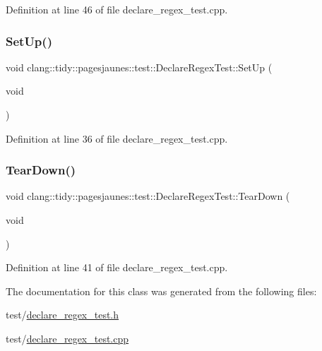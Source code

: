 Definition at line 46 of file declare\+\_\+regex\+\_\+test.\+cpp.

\mbox{\label{classclang_1_1tidy_1_1pagesjaunes_1_1test_1_1_declare_regex_test_ae35e7b27f89dc217207465fe9b408b4f}} 
\subsubsection{\texorpdfstring{Set\+Up()}{SetUp()}}
{\footnotesize\ttfamily void clang\+::tidy\+::pagesjaunes\+::test\+::\+Declare\+Regex\+Test\+::\+Set\+Up (\begin{DoxyParamCaption}\item[{void}]{ }\end{DoxyParamCaption})\hspace{0.3cm}{\ttfamily [virtual]}}



Definition at line 36 of file declare\+\_\+regex\+\_\+test.\+cpp.

\mbox{\label{classclang_1_1tidy_1_1pagesjaunes_1_1test_1_1_declare_regex_test_ae2ff4360622063301d3044b15f2ea85a}} 
\subsubsection{\texorpdfstring{Tear\+Down()}{TearDown()}}
{\footnotesize\ttfamily void clang\+::tidy\+::pagesjaunes\+::test\+::\+Declare\+Regex\+Test\+::\+Tear\+Down (\begin{DoxyParamCaption}\item[{void}]{ }\end{DoxyParamCaption})\hspace{0.3cm}{\ttfamily [virtual]}}



Definition at line 41 of file declare\+\_\+regex\+\_\+test.\+cpp.



The documentation for this class was generated from the following files\+:\begin{DoxyCompactItemize}
\item 
test/\hyperlink{declare__regex__test_8h}{declare\+\_\+regex\+\_\+test.\+h}\item 
test/\hyperlink{declare__regex__test_8cpp}{declare\+\_\+regex\+\_\+test.\+cpp}\end{DoxyCompactItemize}

